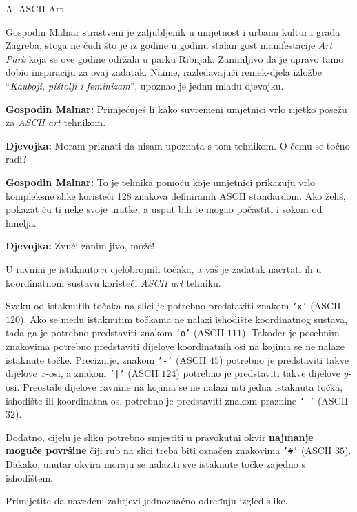 \begin{statement}[
  timelimit=1 s,
  memorylimit=512 MiB,
]{A: ASCII Art}

Gospodin Malnar strastveni je zaljubljenik u umjetnost i urbanu kulturu grada
Zagreba, stoga ne čudi što je iz godine u godinu stalan gost manifestacije
\textit{Art Park} koja se ove godine održala u parku Ribnjak. Zanimljivo da
je upravo tamo dobio inspiraciju za ovaj zadatak. Naime, razledavajući
remek-djela izložbe ``\textit{Kauboji, pištolji i feminizam}'', upoznao je
jednu mladu djevojku.

\textbf{Gospodin Malnar:} Primjećuješ li kako suvremeni umjetnici vrlo
rijetko posežu za \textit{ASCII art} tehnikom.

\textbf{Djevojka:} Moram priznati da nisam upoznata s tom tehnikom. O čemu se
točno radi?

\textbf{Gospodin Malnar:} To je tehnika pomoću koje umjetnici prikazuju vrlo
kompleksne slike koristeći 128 znakova definiranih ASCII standardom. Ako
želiš, pokazat ću ti neke svoje uratke, a usput bih te mogao počastiti i
sokom od hmelja.

\textbf{Djevojka:} Zvući zanimljivo, može!

U ravnini je istaknuto $n$ cjelobrojnih točaka, a vaš je zadatak nacrtati ih u
koordinatnom sustavu koristeći \textit{ASCII art} tehniku.

Svaku od istaknutih točaka na slici je potrebno predstaviti znakom
\texttt{'x'} (ASCII $120$). Ako se među istaknutim točkama ne nalazi
ishodište koordinatnog sustava, tada ga je potrebno predstaviti znakom
\texttt{'o'} (ASCII $111$).  Također je posebnim znakovima potrebno
predstaviti dijelove koordinatnih osi na kojima se ne nalaze istaknute točke.
Preciznije, znakom \texttt{'-'} (ASCII $45$) potrebno je predstaviti takve
dijelove $x$-osi, a znakom \texttt{'|'} (ASCII $124$) potrebno je predstaviti
takve dijelove $y$-osi.  Preostale dijelove ravnine na kojima se ne nalazi
niti jedna istaknuta točka, ishodište ili koordinatna os, potrebno je
predstaviti znakom praznine \texttt{' '} (ASCII $32$).

Dodatno, cijelu je sliku potrebno smjestiti u pravokutni okvir \textbf{najmanje
moguće površine} čiji rub na slici treba biti označen znakovima \texttt{'\#'}
(ASCII $35$). Dakako, unutar okvira moraju se nalaziti sve istaknute točke
zajedno s ishodištem.

Primijetite da navedeni zahtjevi jednoznačno određuju izgled slike.


\end{statement}
